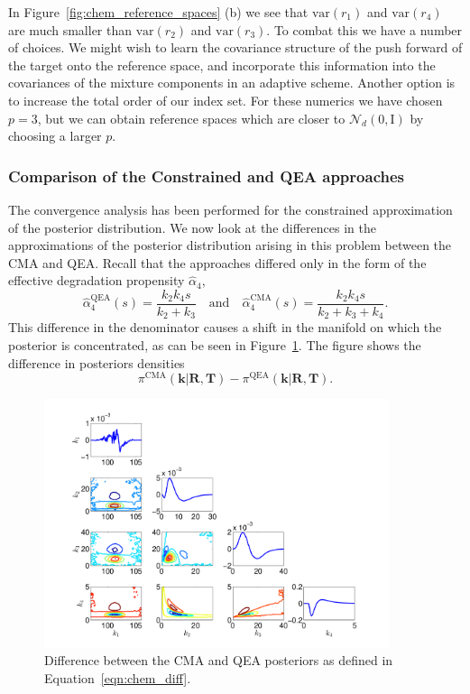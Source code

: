 \documentclass[final]{siamltex}
\begin{document}
In Figure~\ref{fig:chem_reference_spaces} (b) we see that
$\text{var}(r_1)$ and $\text{var}(r_4)$ are much smaller than
$\text{var}(r_2)$ and $\text{var}(r_3)$. To combat this we have a
number of choices. We might wish to learn the covariance structure of
the push forward of the target onto the reference space, and
incorporate this information into the covariances of the mixture
components in an adaptive scheme. Another option is to increase the total order of our index set. For these numerics we have chosen $p=3$, but we can obtain reference spaces which are closer to $\mathcal{N}_d(0, \text{I})$ by choosing a larger $p$.

\subsubsection{Comparison of the Constrained and QEA approaches}

The convergence analysis has been performed for the constrained
approximation of the posterior distribution. We now look at the
differences in the approximations of the posterior distribution
arising in this problem between the CMA and QEA. Recall that the approaches differed only in the form of the effective degradation propensity $\hat{\alpha}_4$,
\[
	\hat{\alpha}_4^{\text{QEA}}(s) = \frac{k_2k_4s}{k_2+k_3} \quad \text{and} \quad \hat{\alpha}_4^{\text{CMA}}(s) = \frac{k_2k_4s}{k_2+k_3+k_4}.
\]
This difference in the denominator causes a shift in the manifold on
which the posterior is concentrated, as can be seen in
Figure~\ref{fig:chem_diff}. The figure shows the difference in
posteriors densities
\begin{equation}\label{eqn:chem_diff}\pi^{\text{CMA}}(\mathbf{k}|\mathbf{R},\mathbf{T}) - \pi^{\text{QEA}}(\mathbf{k}|\mathbf{R},\mathbf{T}).
\end{equation}

\begin{figure}[htb]
\centering
\includegraphics[width=0.9\textwidth]{"images/Applications/Diff_CMA_QEA"}
\caption{Difference between the CMA and QEA posteriors as defined in Equation~\eqref{eqn:chem_diff}.}
\label{fig:chem_diff}
\end{figure}
\end{document}
